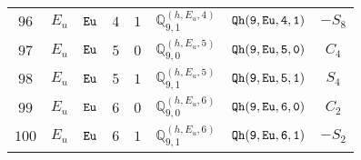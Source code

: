 \documentclass[fleqn,8pt]{jsarticle}
\begin{document}
\begin{table}[ht!]
\begin{center}
\begin{tabular}{cccccccc}
$ 96 $ & $ E_{u} $ & $ {\tt Eu} $ & $ 4 $ & $ 1 $ & $ \mathbb{Q}_{9,1}^{(h,E_{u},4)} $ & $ {\tt Qh(9,Eu,4,1)} $ & $ - S_{8} $ \\
$ 97 $ & $ E_{u} $ & $ {\tt Eu} $ & $ 5 $ & $ 0 $ & $ \mathbb{Q}_{9,0}^{(h,E_{u},5)} $ & $ {\tt Qh(9,Eu,5,0)} $ & $ C_{4} $ \\
$ 98 $ & $ E_{u} $ & $ {\tt Eu} $ & $ 5 $ & $ 1 $ & $ \mathbb{Q}_{9,1}^{(h,E_{u},5)} $ & $ {\tt Qh(9,Eu,5,1)} $ & $ S_{4} $ \\
$ 99 $ & $ E_{u} $ & $ {\tt Eu} $ & $ 6 $ & $ 0 $ & $ \mathbb{Q}_{9,0}^{(h,E_{u},6)} $ & $ {\tt Qh(9,Eu,6,0)} $ & $ C_{2} $ \\
$ 100 $ & $ E_{u} $ & $ {\tt Eu} $ & $ 6 $ & $ 1 $ & $ \mathbb{Q}_{9,1}^{(h,E_{u},6)} $ & $ {\tt Qh(9,Eu,6,1)} $ & $ - S_{2} $ \\
 \hline \hline
\end{tabular}
\end{center}
\end{table}
\end{document}
